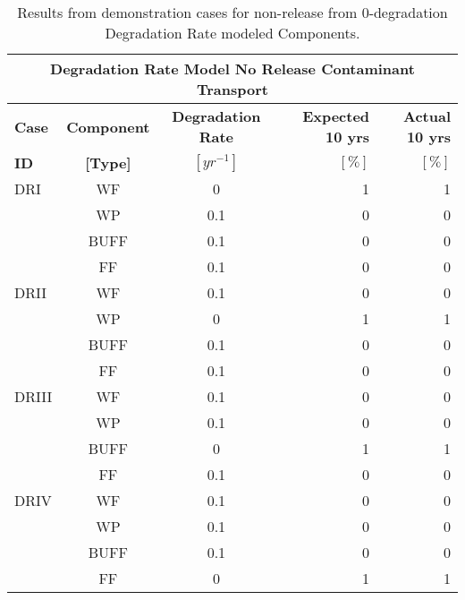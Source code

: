 \begin{table}
\centering
\begin{tabular}{|l|c|c|r|r|}
  \multicolumn{5}{c}{\textbf{Degradation Rate Model No Release Contaminant Transport}}\\
  \hline
  \textbf{Case}  &  \textbf{Component} &  \textbf{Degradation Rate} & \textbf{Expected 10 yrs} & \textbf{Actual 10 yrs}\\
  \textbf{ID}    & \textbf{[Type]} &  \textbf{$[yr^{-1}]$}  &  $[\%]$  & $[\%]$\\
  \hline
  DRI     &  WF    &  0   & 1 & 1\\
          &  WP    &  0.1 & 0 & 0 \\
          &  BUFF  &  0.1 & 0 & 0 \\
          &  FF    &  0.1 & 0 & 0\\
  \hline
  DRII    &  WF    &  0.1 & 0 & 0\\
          &  WP    &  0   & 1 & 1\\
          &  BUFF  &  0.1 & 0 & 0\\
          &  FF    &  0.1 & 0 & 0\\
  \hline
  DRIII   &  WF    &  0.1 & 0 & 0\\
          &  WP    &  0.1 & 0 & 0\\
          &  BUFF  &  0   & 1 & 1\\
          &  FF    &  0.1 & 0 & 0\\
  \hline
  DRIV    &  WF    &  0.1 & 0 & 0\\
          &  WP    &  0.1 & 0 & 0\\
          &  BUFF  &  0.1 & 0 & 0\\
          &  FF    &  0   & 1 & 1\\
  \hline
\end{tabular}
\caption[Degradation rate model no release problem results.]{Results from demonstration cases for non-release from 0-degradation Degradation Rate modeled Components.}
\label{tab:dr_no_release}
\end{table}
